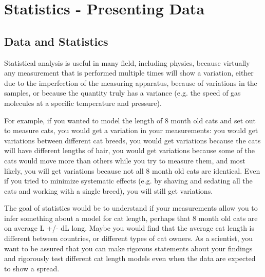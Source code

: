 %
\chapter{Statistics - Presenting Data}
\label{Chap:statData}
\section{Data and Statistics}

Statistical analysis is useful in many field, including physics, because virtually any measurement that is performed multiple times will show a variation, either due to the imperfection of the measuring apparatus, because of variations in the samples, or because the quantity truly has a variance (e.g. the speed of gas molecules at a specific temperature and pressure).

For example, if you wanted to model the length of 8 month old cats and set out to measure cats, you would get a variation in your measurements: you would get variations between different cat breeds, you would get variations because the cats will have different lengths of hair, you would get variations because some of the cats would move more than others while you try to measure them, and most likely, you will get variations because not all 8 month old cats are identical. Even if you tried to minimize systematic effects (e.g. by shaving and sedating all the cats and working with a single breed), you will still get variations. 

The goal of statistics would be to understand if your measurements allow you to infer something about a model for cat length, perhaps that 8 month old cats are on average L +/- dL long. Maybe you would find that the average cat length is different between countries, or different types of cat owners. As a scientist, you want to be assured that you can make rigorous statements about your findings and rigorously test different cat length models even when the data are expected to show a spread.

